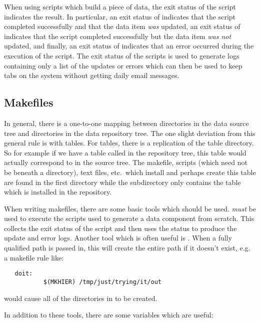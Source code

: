 When using scripts which build a piece of data, the exit status
of the script indicates the result. In particular, an exit status
of  indicates that the script completed successfully and
that the data item \textit{was} updated, an exit status of 
indicates that the script completed successfully but the data item
\textit{was not} updated, and finally, an exit status of 
indicates that an error occurred during the execution of the script.
The exit status of the scripts is used to generate logs containing
only a list of the updates or errors which can then be used to keep
tabs on the system without getting daily email messages.

\subsection*{Makefiles}
In general, there is a one-to-one mapping between directories in
the data source tree and directories in the data repository tree.
The one slight deviation from this general rule is with tables.
For tables, there is a replication of the table directory. So for
example if we have a table called  in the
repository tree, this table would actually correspond to
 in the source tree. The makefile,
scripts (which need not be beneath a  directory),
text files, etc.~which install and perhaps create this table are
found in the first  directory while the 
subdirectory only contains the table which is installed in the
repository.

When writing makefiles, there are some basic tools which should be
used.  \textit{must} be used to execute the scripts
used to generate a data component from scratch. This collects the
exit status of the script and then uses the status to produce the
update and error logs. Another tool which is often useful is
. When a fully qualified path is passed in, this
will create the entire path if it doesn't exist, e.g. a makefile
rule like:

\begin{verbatim}
   doit:
           $(MKHIER) /tmp/just/trying/it/out
\end{verbatim}

\noindent
would cause all of the directories in 
to be created.

In addition to these tools, there are some variables which are useful:

